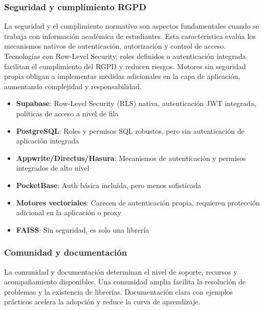 \subsubsection{Seguridad y cumplimiento RGPD}

La seguridad y el cumplimiento normativo son aspectos fundamentales cuando se trabaja con información académica de estudiantes. Esta característica evalúa los mecanismos nativos de autenticación, autorización y control de acceso. Tecnologías con Row-Level Security, roles definidos o autenticación integrada facilitan el cumplimiento del RGPD y reducen riesgos. Motores sin seguridad propia obligan a implementar medidas adicionales en la capa de aplicación, aumentando complejidad y responsabilidad.

\begin{itemize}
    \item \textbf{Supabase}: Row-Level Security (RLS) nativa, autenticación JWT integrada, políticas de acceso a nivel de fila
    \item \textbf{PostgreSQL}: Roles y permisos SQL robustos, pero sin autenticación de aplicación integrada
    \item \textbf{Appwrite/Directus/Hasura}: Mecanismos de autenticación y permisos integrados de alto nivel
    \item \textbf{PocketBase}: Auth básica incluida, pero menos sofisticada
    \item \textbf{Motores vectoriales}: Carecen de autenticación propia, requieren protección adicional en la aplicación o proxy
    \item \textbf{FAISS}: Sin seguridad, es solo una librería
\end{itemize}

\subsubsection{Comunidad y documentación}

La comunidad y documentación determinan el nivel de soporte, recursos y acompañamiento disponibles. Una comunidad amplia facilita la resolución de problemas y la existencia de librerías. Documentación clara con ejemplos prácticos acelera la adopción y reduce la curva de aprendizaje.

